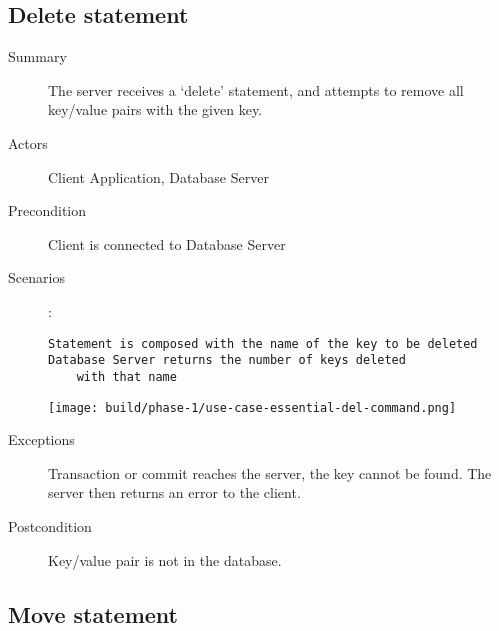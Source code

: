 \documentclass[a4paper]{report}
\begin{document}
	\pagebreak

	\subsection{Delete statement}

	\begin{description}
		\item[Summary] The server receives a ‘delete’ statement, and attempts to remove all key/value pairs with the given key.
		\item[Actors] Client Application, Database Server
		\item[Precondition] Client is connected to Database Server
		\item[Scenarios] :
		
		\begin{lstlisting}
Statement is composed with the name of the key to be deleted
Database Server returns the number of keys deleted
	with that name
		\end{lstlisting}

		\begin{center}
			\texttt{[image: build/phase-1/use-case-essential-del-command.png]}
		\end{center}

		\item[Exceptions] Transaction or commit reaches the server, the key cannot be found.  The server then returns an error to the client.
		\item[Postcondition] Key/value pair is not in the database.
	\end{description}
	
	\pagebreak

	\subsection{Move statement}
\end{document}
